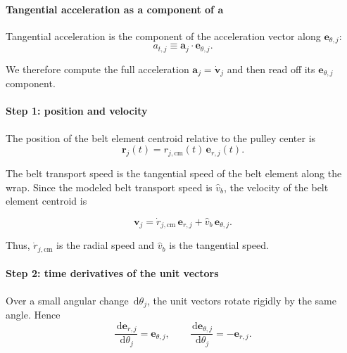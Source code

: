 \documentclass[11pt]{article}
\numberwithin{equation}{section}
\newcommand{\dd}{\,\mathrm{d}}
\begin{document}
\paragraph{Tangential acceleration as a component of \(\mathbf a\)}

Tangential acceleration is the component of the acceleration vector along
\(\mathbf e_{\theta,j}\):
\begin{equation}
a_{t,j} \equiv \mathbf a_j\cdot \mathbf e_{\theta,j}.
\label{eq:at_component_def}
\end{equation}

We therefore compute the full acceleration \(\mathbf a_j=\dot{\mathbf v}_j\)
and then read off its \(\mathbf e_{\theta,j}\) component.

\paragraph{Step 1: position and velocity}

The position of the belt element centroid relative to the pulley center is
\begin{equation}
\mathbf r_j(t) = r_{j,\mathrm{cm}}(t)\,\mathbf e_{r,j}(t).
\label{eq:position_polar}
\end{equation}

The belt transport speed is the tangential speed of the belt element along the
wrap. Since the modeled belt transport speed is \(\hat v_b\), the velocity of
the belt element centroid is

\begin{equation}
\mathbf v_j
=
\dot r_{j,\mathrm{cm}}\,\mathbf e_{r,j}
+
\hat v_b\,\mathbf e_{\theta,j}.
\label{eq:velocity_polar_vb}
\end{equation}

Thus, \(\dot r_{j,\mathrm{cm}}\) is the radial speed and \(\hat v_b\) is the
tangential speed.

\paragraph{Step 2: time derivatives of the unit vectors}

Over a small angular change \(\dd\theta_j\), the unit vectors rotate rigidly by
the same angle. Hence
\begin{equation}
\frac{\dd \mathbf e_{r,j}}{\dd\theta_j} = \mathbf e_{\theta,j},
\qquad
\frac{\dd \mathbf e_{\theta,j}}{\dd\theta_j} = -\mathbf e_{r,j}.
\label{eq:unit_vectors_angle_derivatives}
\end{equation}
\end{document}
